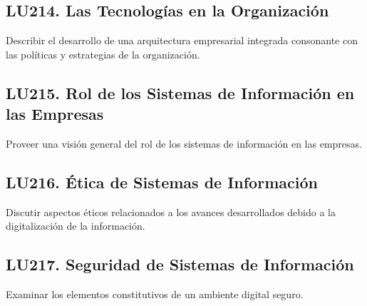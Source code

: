 \subsection{LU214. Las Tecnologías en la Organización}\label{sec:LU214}
\begin{LearningUnit}
\begin{LUGoal}
\item Describir el desarrollo de una arquitectura empresarial integrada consonante con las políticas y estrategias de la organización.
\end{LUGoal}

\end{LearningUnit}

\subsection{LU215. Rol de los Sistemas de Información en las Empresas}\label{sec:LU215}
\begin{LearningUnit}
\begin{LUGoal}
\item Proveer una visión general del rol de los sistemas de información en las empresas.
\end{LUGoal}

\end{LearningUnit}

\subsection{LU216. Ética de Sistemas de Información}\label{sec:LU216}
\begin{LearningUnit}
\begin{LUGoal}
\item Discutir aspectos éticos relacionados a los avances desarrollados debido a la digitalización de la información.
\end{LUGoal}

\end{LearningUnit}

\subsection{LU217. Seguridad de Sistemas de Información}\label{sec:LU217}
\begin{LearningUnit}
\begin{LUGoal}
\item Examinar los elementos constitutivos de un ambiente digital seguro.
\end{LUGoal}

\end{LearningUnit}

